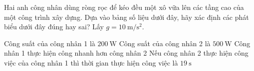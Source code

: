 \begin{ex}
	Hai anh công nhân dùng ròng rọc để kéo đều một xô vữa lên các tầng cao của một công trình xây dựng. Dựa vào bảng số liệu dưới đây, hãy xác định các phát biểu dưới đây đúng hay sai? Lấy $g=\SI{10}{\meter / \second \squared}$.
	\begin{center}
		\renewcommand{\arraystretch}{1.1} %
		\setlength{\tabcolsep}{8pt} %
	\end{center}
	\choiceTF
	{\True Công suất của công nhân 1 là $\SI{200}{\watt}$}
	{Công suất của công nhân 2 là $\SI{500}{\watt}$}
	{\True Công nhân 1 thực hiện công nhanh hơn công nhân 2}
	{Nếu công nhân 2 thực hiện công việc của công nhân 1 thì thời gian thực hiện công việc là $\SI{19}{\second}$}
\end{ex}
